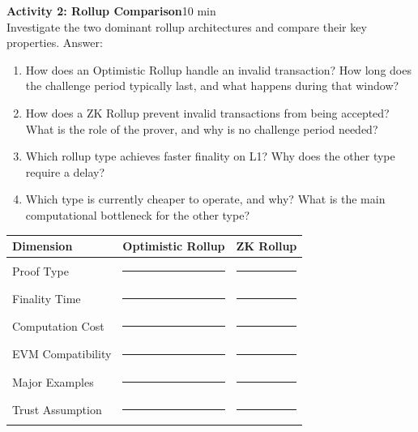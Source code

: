 \documentclass[11pt,a4paper]{article}
\newcommand{\activitybox}[3]{%
  \noindent\colorbox{mllavender4}{\parbox{\dimexpr\linewidth-2\fboxsep}{%
    \textbf{\color{mlpurple}#1}\hfill\textcolor{mlgray}{\small #2}\\[2pt]#3%
  }}\par\vspace{4pt}%
}
\newcommand{\fillcell}{\rule{2.2cm}{0.3pt}}
\begin{document}
\activitybox{Activity 2: Rollup Comparison}{10 min}{%
Investigate the two dominant rollup architectures and compare their key properties. Answer:
\begin{enumerate}
\item How does an Optimistic Rollup handle an invalid transaction? How long does the challenge period typically last, and what happens during that window?
\item How does a ZK Rollup prevent invalid transactions from being accepted? What is the role of the prover, and why is no challenge period needed?
\item Which rollup type achieves faster finality on L1? Why does the other type require a delay?
\item Which type is currently cheaper to operate, and why? What is the main computational bottleneck for the other type?
\end{enumerate}
\vspace{4pt}
{\footnotesize\renewcommand{\arraystretch}{1.35}%
\setlength{\tabcolsep}{5pt}%
\begin{tabular}{@{}p{3.4cm}p{4.6cm}p{4.6cm}@{}}
\toprule
\textbf{Dimension} & \textbf{Optimistic Rollup} & \textbf{ZK Rollup} \\
\midrule
Proof Type           & \fillcell & \fillcell \\
Finality Time        & \fillcell & \fillcell \\
Computation Cost     & \fillcell & \fillcell \\
EVM Compatibility    & \fillcell & \fillcell \\
Major Examples       & \fillcell & \fillcell \\
Trust Assumption     & \fillcell & \fillcell \\
\bottomrule
\end{tabular}}
\vspace{2pt}
}

\vspace{2pt}
\end{document}
